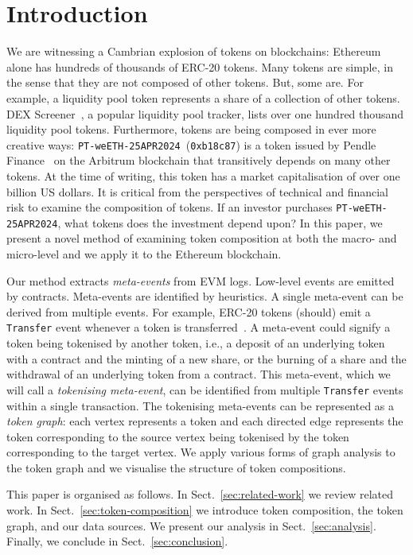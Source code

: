 \section{Introduction}\label{sec:introduction}

We are witnessing a Cambrian explosion of tokens on blockchains:
Ethereum alone has hundreds of thousands of ERC-20 tokens.  Many
tokens are simple, in the sense that they are not composed of other
tokens.  But, some are.  For example, a liquidity pool token
represents a share of a collection of other tokens.  DEX
Screener~\cite{dex-screener-xx}, a popular liquidity pool tracker,
lists over one hundred thousand liquidity pool tokens.  Furthermore,
tokens are being composed in ever more creative ways:
\texttt{PT-weETH-25APR2024}~(\texttt{0xb18c87}) is a token issued by
Pendle Finance~\cite{nguyen-vuong-22} on the Arbitrum blockchain that
transitively depends on many other tokens.  At the time of writing,
this token has a market capitalisation of over one billion US dollars.
It is critical from the perspectives of technical and financial risk
to examine the composition of tokens.  If an investor purchases
\texttt{PT-weETH-25APR2024}, what tokens does the investment depend
upon?  In this paper, we present a novel method of examining token
composition at both the macro- and micro-level and we apply it to the
Ethereum blockchain.

Our method extracts \textit{meta-events} from EVM logs.  Low-level
events are emitted by contracts.  Meta-events are identified by
heuristics.  A single meta-event can be derived from multiple events.
For example, ERC-20 tokens (should) emit a \texttt{Transfer} event
whenever a token is transferred~\cite{vogelsteller-buterin-15}.  A
meta-event could signify a token being tokenised by another token,
i.e., a deposit of an underlying token with a contract and the minting
of a new share, or the burning of a share and the withdrawal of an
underlying token from a contract.  This meta-event, which we will call
a \textit{tokenising meta-event}, can be identified from multiple
\texttt{Transfer} events within a single transaction.  The tokenising
meta-events can be represented as a \textit{token graph}: each vertex
represents a token and each directed edge represents the token
corresponding to the source vertex being tokenised by the token
corresponding to the target vertex.  We apply various forms of graph
analysis to the token graph and we visualise the structure of token
compositions.

This paper is organised as follows.  In Sect.~\ref{sec:related-work}
we review related work.  In Sect.~\ref{sec:token-composition} we
introduce token composition, the token graph, and our data sources.
We present our analysis in Sect.~\ref{sec:analysis}.  Finally, we
conclude in Sect.~\ref{sec:conclusion}.
